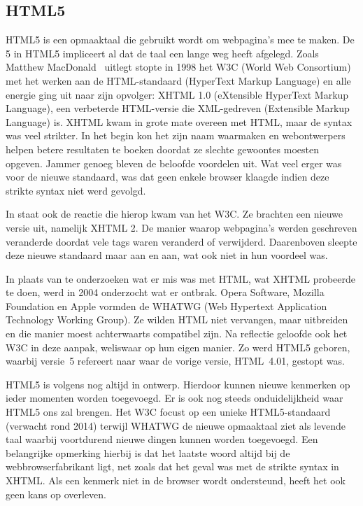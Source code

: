 \subsection{HTML5}
\label{sec:html5}
HTML5 is een opmaaktaal die gebruikt wordt om webpagina's mee te maken.
De 5 in HTML5 impliceert al dat de taal een lange weg heeft afgelegd.
Zoals Matthew MacDonald~\cite{MacDonald2011} uitlegt stopte in 1998 het W3C (World Web Consortium) met het werken aan de HTML-standaard (HyperText Markup Language) en alle energie ging uit naar zijn opvolger: XHTML 1.0 (eXtensible HyperText Markup Language), een verbeterde HTML-versie die XML-gedreven (Extensible Markup Language) is. 
XHTML kwam in grote mate overeen met HTML, maar de syntax was veel strikter. 
In het begin kon het zijn naam waarmaken en webontwerpers helpen betere resultaten te boeken doordat ze slechte gewoontes moesten opgeven. 
Jammer genoeg bleven de beloofde voordelen uit. 
Wat veel erger was voor de nieuwe standaard, was dat geen enkele browser klaagde indien deze strikte syntax niet werd gevolgd.

In \cite{MacDonald2011} staat ook de reactie die hierop kwam van het W3C.  
Ze brachten een nieuwe versie uit, namelijk XHTML 2.
De manier waarop webpagina's werden geschreven veranderde doordat vele tags waren veranderd of verwijderd. 
Daarenboven sleepte deze nieuwe standaard maar aan en aan, wat ook niet in hun voordeel was. 

In plaats van te onderzoeken wat er mis was met HTML, wat XHTML probeerde te doen, werd in 2004 onderzocht wat er ontbrak. 
Opera Software, Mozilla Foundation en Apple vormden de WHATWG (Web Hypertext Application Technology Working Group). 
Ze wilden HTML niet vervangen, maar uitbreiden en die manier moest achterwaarts compatibel zijn. 
Na reflectie geloofde ook het W3C in deze aanpak, weliswaar op hun eigen manier.  
Zo werd HTML5 geboren, waarbij versie~5 refereert naar waar de vorige versie, HTML~4.01, gestopt was.

HTML5 is volgens \cite{MacDonald2011} nog altijd in ontwerp. 
Hierdoor kunnen nieuwe kenmerken op ieder momenten worden toegevoegd.  
Er is ook nog steeds onduidelijkheid waar HTML5 ons zal brengen.  
Het W3C focust op een unieke HTML5-standaard (verwacht rond 2014) terwijl WHATWG de nieuwe opmaaktaal ziet als levende taal waarbij voortdurend  nieuwe dingen kunnen worden toegevoegd. 
Een belangrijke opmerking hierbij is dat het laatste woord altijd bij de webbrowserfabrikant ligt, net zoals dat het geval was met de strikte syntax in XHTML. 
Als een kenmerk niet in de browser wordt ondersteund, heeft het ook geen kans op overleven.

